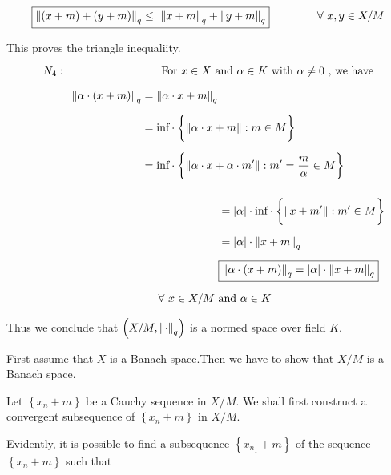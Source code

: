 \documentclass[a4paper,12pt]{article}
\begin{document}
    \[\boxed{\norm{(x+m) + (y + m)}_q \leq\  \norm{x + m}_q + \norm{y + m}_q} \hspace*{1.5cm} \forall\ x,y\in X/M\]

    This proves the triangle inequaliity.

    \vspace*{0.5cm}

    \[N_4: \hspace*{3cm} \mbox{For $x\in X$ and $\alpha\in K$ with $\alpha\neq 0$ , we have}\]
    
    \begin{equation*}
        \begin{split}
            \norm{\alpha \cdot (x + m)}_q & = \norm{\alpha \cdot x + m}_q\\[2mm]
            & = \mbox{inf}\cdot \biggl\{\norm{\alpha \cdot x + m} : m\in M\biggr\}\\[2mm]
            & = \mbox{inf}\cdot \biggl\{\norm{\alpha \cdot x + \alpha \cdot m'} : m'=\frac{m}{\alpha}\in M\biggr\}\\[2mm]
        \end{split}
    \end{equation*}


    \begin{equation*}
        \begin{split}
            & = |\alpha| \cdot \mbox{inf}\cdot \biggl\{\norm{x + m'} : m'\in M\biggr\}\\[2mm]
            &  = |\alpha| \cdot \norm{x + m}_q\\[2mm]
            & \boxed{\norm{\alpha \cdot (x + m)}_q = |\alpha| \cdot \norm{x + m}_q}\\[2mm] 
            \hspace*{4cm} \forall\ x\in X/M\ & \mbox{and}\ \alpha\in K 
        \end{split}
    \end{equation*}

    Thus we conclude that $\left(X/M, \norm{\cdot}_q\right)$ is a normed space over field $K$.

    \vspace*{0.3cm}

    First assume that $X$ is a Banach space.Then we have to show that $X/M$ is a Banach space.

    Let $\left\{x_n + m\right\}$ be a Cauchy sequence in $X/M$.
    We shall first construct a convergent subsequence of $\left\{x_n + m\right\}$ in $X/M$.

    Evidently, it is possible to find a subsequence $\left\{x_{n_1} + m\right\}$ of the sequence $\left\{x_n + m\right\}$ such that
\end{document}
